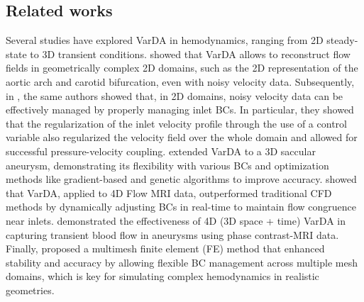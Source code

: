 \subsection*{Related works}
\label{sec:background}
Several studies have explored VarDA in hemodynamics, ranging from 2D steady-state to 3D transient conditions. \cite{Delia2012} showed that VarDA allows to reconstruct flow fields in geometrically complex 2D domains, such as the 2D representation of the aortic arch and carotid bifurcation, even with noisy velocity data. Subsequently, in \cite{Delia2013}, the same authors showed that, in 2D domains, noisy velocity data can be effectively managed by properly managing inlet BCs. In particular, they showed that the regularization of the inlet velocity profile through the use of a control variable also regularized the velocity field over the whole domain and allowed for successful pressure-velocity coupling. \cite{Tiago2017} extended VarDA to a 3D saccular aneurysm, demonstrating its flexibility with various BCs and optimization methods like gradient-based and genetic algorithms to improve accuracy. \cite{Koltukluoglu2018} showed that VarDA, applied to 4D Flow MRI data, outperformed traditional CFD methods by dynamically adjusting BCs in real-time to maintain flow congruence near inlets. \cite{Funke2019} demonstrated the effectiveness of 4D (3D space + time) VarDA in capturing transient blood flow in aneurysms using phase contrast-MRI data. Finally, \cite{Dokken2020} proposed a multimesh finite element (FE) method that enhanced stability and accuracy by allowing flexible BC management across multiple mesh domains, which is key for simulating complex hemodynamics in realistic geometries.

